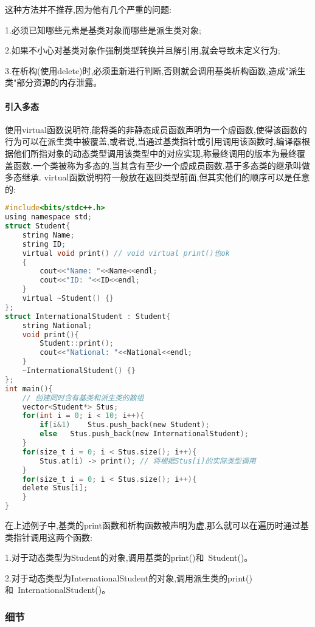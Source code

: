 \documentclass[UTF8]{ctexart}
\begin{document}
这种方法并不推荐,因为他有几个严重的问题:

1.必须已知哪些元素是基类对象而哪些是派生类对象;

2.如果不小心对基类对象作强制类型转换并且解引用,就会导致未定义行为;

3.在析构(使用delete)时,必须重新进行判断,否则就会调用基类析构函数,造成"派生类"部分资源的内存泄露。

\paragraph{引入多态}
使用virtual函数说明符,能将类的非静态成员函数声明为一个虚函数,使得该函数的行为可以在派生类中被覆盖,或者说,当通过基类指针或引用调用该函数时,编译器根据他们所指对象的动态类型调用该类型中的对应实现,称最终调用的版本为最终覆盖函数.一个类被称为多态的,当其含有至少一个虚成员函数.基于多态类的继承叫做多态继承.
virtual函数说明符一般放在返回类型前面,但其实他们的顺序可以是任意的:
\begin{lstlisting}[language = C,basicstyle=\small\ttfamily]
#include<bits/stdc++.h>
using namespace std;
struct Student{    
    string Name;   
    string ID;
    virtual void print() // void virtual print()也ok    
    {        
        cout<<"Name: "<<Name<<endl;        
        cout<<"ID: "<<ID<<endl;    
    }    
    virtual ~Student() {}
};
struct InternationalStudent : Student{   
    string National;
    void print(){        
        Student::print();        
        cout<<"National: "<<National<<endl;    
    }    
    ~InternationalStudent() {}
};
int main(){    
    // 创建同时含有基类和派生类的数组    
    vector<Student*> Stus;     
    for(int i = 0; i < 10; i++){        
        if(i&1)    Stus.push_back(new Student);        
        else   Stus.push_back(new InternationalStudent);    
    }
    for(size_t i = 0; i < Stus.size(); i++){        
        Stus.at(i) -> print(); // 将根据Stus[i]的实际类型调用    
    }
    for(size_t i = 0; i < Stus.size(); i++){        
    delete Stus[i];    
    }
}
\end{lstlisting}

在上述例子中,基类的print函数和析构函数被声明为虚,那么就可以在遍历时通过基类指针调用这两个函数:

1.对于动态类型为Student的对象,调用基类的print()和~Student()。

2.对于动态类型为InternationalStudent的对象,调用派生类的print()和~InternationalStudent()。

\subsubsection{细节}
\end{document}
